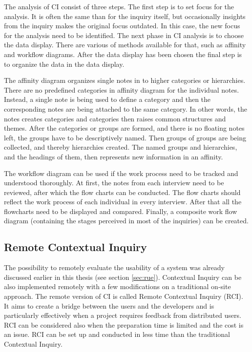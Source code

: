\documentclass[12pt,a4paper,oneside,pdftex]{report}
\begin{document}
The analysis of CI consist of three steps. The first step is to set focus for the analysis. It is often the same than for the inquiry itself, but occasionally insights from the inquiry makes the original focus outdated. In this case, the new focus for the analysis need to be identified. The next phase in CI analysis is to choose the data display. There are various of methods available for that, such as affinity and workflow diagrams. After the data display has been chosen the final step is to organize the data in the data display. \cite{RefWorks:28}

The affinity diagram organizes single notes in to higher categories or hierarchies. There are no predefined categories in affinity diagram for the individual notes. Instead, a single note is being used to define a category and then the corresponding notes are being attached to the same category. In other words, the notes creates categories and categories then raises common structures and themes. After the categories or groups are formed, and there is no floating notes left, the groups have to be descriptively named. Then groups of groups are being collected, and thereby hierarchies created. The named groups and hierarchies, and the headings of them, then represents new information in an affinity. \cite{RefWorks:21, RefWorks:28}

The workflow diagram can be used if the work process need to be tracked and understood thoroughly. At first, the notes from each interview need to be reviewed, after which the flow charts can be conducted. The flow charts should reflect the work process of each individual in every interview. After that all the flowcharts need to be displayed and compared. Finally, a composite work flow diagram (containing the stages perceived in most of the inquiries) can be created. \cite{RefWorks:28}

\subsection{Remote Contextual Inquiry}
The possibility to remotely evaluate the usability of a system was already discussed earlier in this thesis (see section \ref{sec:rue}). Contextual Inquiry can be also implemented remotely with a few modifications on a traditional on-site approach. The remote version of CI is called Remote Contextual Inquiry (RCI). It aims to create a bridge between the users and the developers and is particularly effectively when a project requires feedback from distributed users. RCI can be considered also when the preparation time is limited and the cost is an issue. RCI can be set up and conducted in less time than the traditional Contextual Inquiry. \cite{RefWorks:32}
\end{document}
